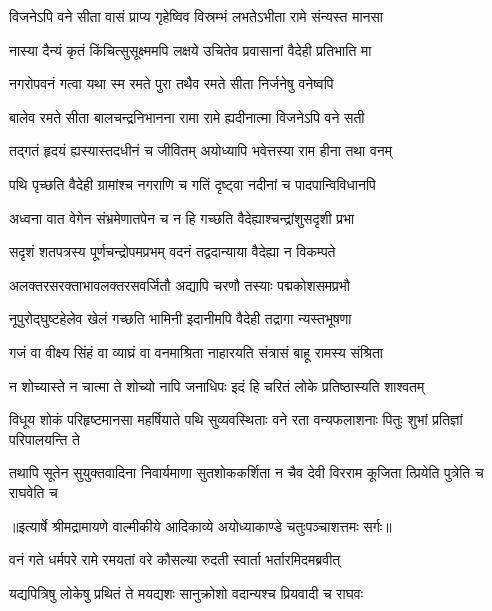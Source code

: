 \twolineshloka
{विजनेऽपि वने सीता वासं प्राप्य गृहेष्विव}
{विस्रम्भं लभतेऽभीता रामे संन्यस्त मानसा} %

\twolineshloka
{नास्या दैन्यं कृतं किंचित्सुसूक्ष्ममपि लक्षये}
{उचितेव प्रवासानां वैदेही प्रतिभाति मा} %

\twolineshloka
{नगरोपवनं गत्वा यथा स्म रमते पुरा}
{तथैव रमते सीता निर्जनेषु वनेष्वपि} %

\twolineshloka
{बालेव रमते सीता बालचन्द्रनिभानना}
{रामा रामे ह्यदीनात्मा विजनेऽपि वने सती} %

\twolineshloka
{तद्गतं हृदयं ह्यस्यास्तदधीनं च जीवितम्}
{अयोध्यापि भवेत्तस्या राम हीना तथा वनम्} %

\twolineshloka
{पथि पृच्छति वैदेही ग्रामांश्च नगराणि च}
{गतिं दृष्ट्वा नदीनां च पादपान्विविधानपि} %

\twolineshloka
{अध्वना वात वेगेन संभ्रमेणातपेन च}
{न हि गच्छति वैदेह्याश्चन्द्रांशुसदृशी प्रभा} %

\twolineshloka
{सदृशं शतपत्रस्य पूर्णचन्द्रोपमप्रभम्}
{वदनं तद्वदान्याया वैदेह्या न विकम्पते} %

\twolineshloka
{अलक्तरसरक्ताभावलक्तरसवर्जितौ}
{अद्यापि चरणौ तस्याः पद्मकोशसमप्रभौ} %

\twolineshloka
{नूपुरोद्घुष्टहेलेव खेलं गच्छति भामिनी}
{इदानीमपि वैदेही तद्रागा न्यस्तभूषणा} %

\twolineshloka
{गजं वा वीक्ष्य सिंहं वा व्याघ्रं वा वनमाश्रिता}
{नाहारयति संत्रासं बाहू रामस्य संश्रिता} %

\twolineshloka
{न शोच्यास्ते न चात्मा ते शोच्यो नापि जनाधिपः}
{इदं हि चरितं लोके प्रतिष्ठास्यति शाश्वतम्} %

\fourlineindentedshloka
{विधूय शोकं परिहृष्टमानसा}
{ महर्षियाते पथि सुव्यवस्थिताः}
{वने रता वन्यफलाशनाः पितुः}
{ शुभां प्रतिज्ञां परिपालयन्ति ते} %

\fourlineindentedshloka
{तथापि सूतेन सुयुक्तवादिना}
{ निवार्यमाणा सुतशोककर्शिता}
{न चैव देवी विरराम कूजिता}
{त्प्रियेति पुत्रेति च राघवेति च} %


{॥इत्यार्षे श्रीमद्रामायणे वाल्मीकीये आदिकाव्ये अयोध्याकाण्डे चतुःपञ्चाशत्तमः सर्गः॥}


\twolineshloka
{वनं गते धर्मपरे रामे रमयतां वरे}
{कौसल्या रुदती स्वार्ता भर्तारमिदमब्रवीत्} %

\twolineshloka
{यद्यपित्रिषु लोकेषु प्रथितं ते मयद्यशः}
{सानुक्रोशो वदान्यश्च प्रियवादी च राघवः} %

